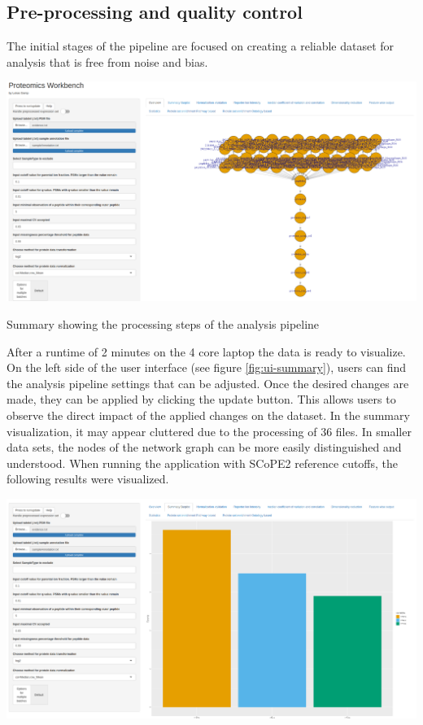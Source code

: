 \documentclass[
  11pt,
]{article}
\let\origfigure\figure
\begin{document}
\hypertarget{pre-processing-and-quality-control}{%
\subsection{Pre-processing and quality control}\label{pre-processing-and-quality-control}}

The initial stages of the pipeline are focused on creating a reliable dataset for analysis that is free from noise and bias.

\bgroup  \origfigure[H] 

{\centering \includegraphics[width=1\linewidth]{screenshots/overview} 

}

\caption{Summary showing the processing steps of the analysis pipeline}\label{fig:ui-summary}
 \endfigure\egroup

After a runtime of 2 minutes on the 4 core laptop the data is ready to visualize. On the left side of the user interface (see figure \ref{fig:ui-summary}), users can find the analysis pipeline settings that can be adjusted. Once the desired changes are made, they can be applied by clicking the update button. This allows users to observe the direct impact of the applied changes on the dataset.
In the summary visualization, it may appear cluttered due to the processing of 36 files. In smaller data sets, the nodes of the network graph can be more easily distinguished and understood.
When running the application with SCoPE2 \citep{Specht2021} reference cutoffs, the following results were visualized.

\newpage
\bgroup  \origfigure[H] 

{\centering \includegraphics[width=1\linewidth]{screenshots/numbers_default} 

}
\end{document}
